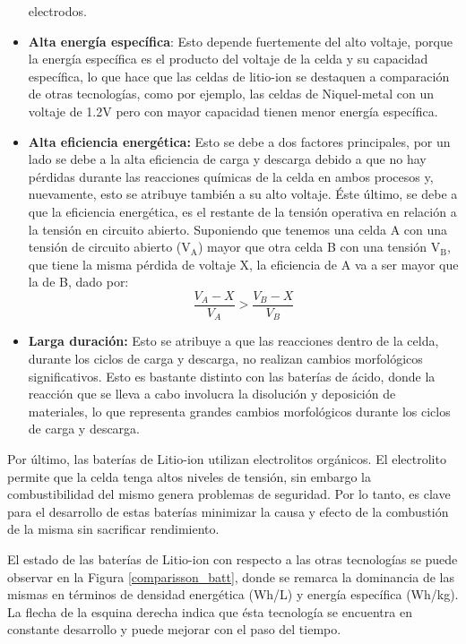 \documentclass[10pt,a4paper]{article}
\begin{document}
\begin{itemize}
    electrodos.
    \item \textbf{Alta energ\'ia espec\'ifica}: Esto depende fuertemente del alto 
    voltaje, porque la energía específica es el producto del voltaje de la celda 
    y su capacidad específica, lo que hace que las celdas de litio-ion se 
    destaquen a comparación de otras tecnologías, como por ejemplo, las celdas 
    de Niquel-metal con un voltaje de 1.2V pero con mayor capacidad tienen menor 
    energía específica. 
    \item \textbf{Alta eficiencia energética:} Esto se debe a dos 
	factores principales, por un lado se debe a la alta eficiencia de 
	carga y descarga debido a que no hay pérdidas durante las reacciones 
	químicas de la celda en ambos procesos y, nuevamente, esto se atribuye 
	también a su alto voltaje. Éste último, se debe a que la eficiencia 
	energética, es el restante de la tensión operativa en relación a la 
	tensión en circuito abierto. Suponiendo que tenemos una celda A con una 
	tensión de circuito abierto ($\mathrm{V_A}$) mayor que otra celda B con 
	una tensión $\mathrm{V_B}$, que tiene la misma pérdida de voltaje X, 
	la eficiencia de A va a ser mayor que la de B, dado por:
	\vspace{5mm}
	\begin{equation}
	    \frac{V_A - X}{V_A} > \frac{V_B - X}{V_B} \nonumber
	\end{equation}
    \item \textbf{Larga duración:} Esto se atribuye a que las reacciones 
	dentro de la celda, durante los ciclos de carga y descarga, no realizan 
	cambios morfológicos significativos. Esto es bastante distinto con las 
	baterías de ácido, donde la reacción que se lleva a cabo involucra la 
	disolución y deposición de materiales, lo que representa grandes 
	cambios morfológicos durante los ciclos de carga y descarga.
\end{itemize}

\noindent Por último, las baterías de Litio-ion utilizan electrolitos orgánicos.
El electrolito permite que la celda tenga altos niveles de tensión, sin embargo
la combustibilidad del mismo genera problemas de seguridad. Por lo tanto, es
clave para el desarrollo de estas baterías minimizar la causa y efecto de la
combustión de la misma sin sacrificar rendimiento.

\noindent El estado de las baterías de Litio-ion con respecto a las otras
tecnologías se puede observar en la Figura \ref{comparisson_batt}, donde se
remarca la dominancia de las mismas en términos de densidad energética (Wh/L) y 
energía específica (Wh/kg). La flecha de la esquina derecha indica que ésta 
tecnología se encuentra en constante desarrollo y puede mejorar con el paso del 
tiempo.
\end{document}
